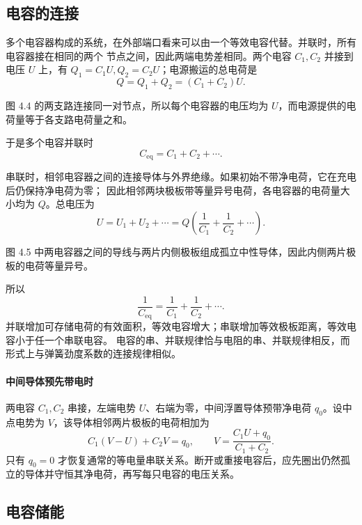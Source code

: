 \subsection*{电容的连接}

多个电容器构成的系统，在外部端口看来可以由一个等效电容代替。并联时，所有电容器接在相同的两个
节点之间，因此两端电势差相同。两个电容 $C_1,C_2$ 并接到电压 $U$ 上，有
$Q_1=C_1U,Q_2=C_2U$；电源搬运的总电荷是
\[
  Q=Q_1+Q_2=(C_1+C_2)U.
\]

图 4.4 的两支路连接同一对节点，所以每个电容器的电压均为 $U$，而电源提供的电荷量等于各支路电荷量之和。

\capacitorParallelFigure
{}

于是多个电容并联时
\begin{equation}
  \boxed{C_{\mathrm{eq}}=C_1+C_2+\cdots}.
\end{equation}

串联时，相邻电容器之间的连接导体与外界绝缘。如果初始不带净电荷，它在充电后仍保持净电荷为零；
因此相邻两块极板带等量异号电荷，各电容器的电荷量大小均为 $Q$。总电压为
\[
  U=U_1+U_2+\cdots=Q\left(\frac1{C_1}+\frac1{C_2}+\cdots\right).
\]

图 4.5 中两电容器之间的导线与两片内侧极板组成孤立中性导体，因此内侧两片极板的电荷等量异号。

\capacitorSeriesFigure
{}

所以
\begin{equation}
  \boxed{\frac1{C_{\mathrm{eq}}}=\frac1{C_1}+\frac1{C_2}+\cdots}.
\end{equation}
并联增加可存储电荷的有效面积，等效电容增大；串联增加等效极板距离，等效电容小于任一个串联电容。
电容的串、并联规律恰与电阻的串、并联规律相反，而形式上与弹簧劲度系数的连接规律相似。


\paragraph{中间导体预先带电时}
两电容 $C_1,C_2$ 串接，左端电势 $U$、右端为零，中间浮置导体预带净电荷 $q_0$。设中点电势为 $V$，该导体相邻两片极板的电荷相加为
\[
 C_1(V-U)+C_2V=q_0,
 \qquad V=\frac{C_1U+q_0}{C_1+C_2}.
\]
只有 $q_0=0$ 才恢复通常的等电量串联关系。断开或重接电容后，应先圈出仍然孤立的导体并守恒其净电荷，再写每只电容的电压关系。

\subsection*{电容储能}

